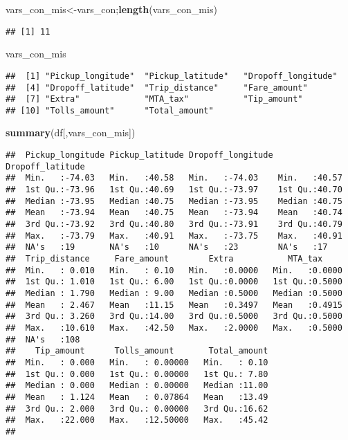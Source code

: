 \documentclass[]{article}
\newenvironment{Shaded}{\begin{snugshade}}{\end{snugshade}}
\newcommand{\KeywordTok}[1]{\textcolor[rgb]{0.13,0.29,0.53}{\textbf{{#1}}}}
\newcommand{\NormalTok}[1]{{#1}}
\begin{document}
\begin{Shaded}
\begin{Highlighting}[]
\NormalTok{vars_con_mis<-vars_con;}\KeywordTok{length}\NormalTok{(vars_con_mis)}
\end{Highlighting}
\end{Shaded}

\begin{verbatim}
## [1] 11
\end{verbatim}

\begin{Shaded}
\begin{Highlighting}[]
\NormalTok{vars_con_mis}
\end{Highlighting}
\end{Shaded}

\begin{verbatim}
##  [1] "Pickup_longitude"  "Pickup_latitude"   "Dropoff_longitude"
##  [4] "Dropoff_latitude"  "Trip_distance"     "Fare_amount"      
##  [7] "Extra"             "MTA_tax"           "Tip_amount"       
## [10] "Tolls_amount"      "Total_amount"
\end{verbatim}

\begin{Shaded}
\begin{Highlighting}[]
\KeywordTok{summary}\NormalTok{(df[,vars_con_mis])}
\end{Highlighting}
\end{Shaded}

\begin{verbatim}
##  Pickup_longitude Pickup_latitude Dropoff_longitude Dropoff_latitude
##  Min.   :-74.03   Min.   :40.58   Min.   :-74.03    Min.   :40.57   
##  1st Qu.:-73.96   1st Qu.:40.69   1st Qu.:-73.97    1st Qu.:40.70   
##  Median :-73.95   Median :40.75   Median :-73.95    Median :40.75   
##  Mean   :-73.94   Mean   :40.75   Mean   :-73.94    Mean   :40.74   
##  3rd Qu.:-73.92   3rd Qu.:40.80   3rd Qu.:-73.91    3rd Qu.:40.79   
##  Max.   :-73.79   Max.   :40.91   Max.   :-73.75    Max.   :40.91   
##  NA's   :19       NA's   :10      NA's   :23        NA's   :17      
##  Trip_distance     Fare_amount        Extra           MTA_tax      
##  Min.   : 0.010   Min.   : 0.10   Min.   :0.0000   Min.   :0.0000  
##  1st Qu.: 1.010   1st Qu.: 6.00   1st Qu.:0.0000   1st Qu.:0.5000  
##  Median : 1.790   Median : 9.00   Median :0.5000   Median :0.5000  
##  Mean   : 2.467   Mean   :11.15   Mean   :0.3497   Mean   :0.4915  
##  3rd Qu.: 3.260   3rd Qu.:14.00   3rd Qu.:0.5000   3rd Qu.:0.5000  
##  Max.   :10.610   Max.   :42.50   Max.   :2.0000   Max.   :0.5000  
##  NA's   :108                                                       
##    Tip_amount      Tolls_amount       Total_amount  
##  Min.   : 0.000   Min.   : 0.00000   Min.   : 0.10  
##  1st Qu.: 0.000   1st Qu.: 0.00000   1st Qu.: 7.80  
##  Median : 0.000   Median : 0.00000   Median :11.00  
##  Mean   : 1.124   Mean   : 0.07864   Mean   :13.49  
##  3rd Qu.: 2.000   3rd Qu.: 0.00000   3rd Qu.:16.62  
##  Max.   :22.000   Max.   :12.50000   Max.   :45.42  
## 
\end{verbatim}
\end{document}
